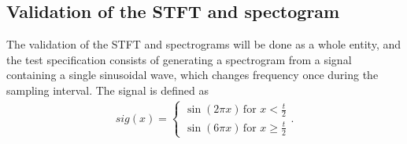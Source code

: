 \subsection{Validation of the STFT and spectogram}
The validation of the STFT and spectrograms will be done as a whole entity, and the test specification consists of generating a spectrogram from a signal containing a single sinusoidal wave, which changes frequency once during the sampling interval. The signal is defined as
\begin{align}\label{eq:SPECTROsignal}
sig(x)=\begin{cases}\sin(2\pi x)\,\text{for }x<\frac{t}{2}\\
\sin(6\pi x)\,\text{for }x\geq\frac{t}{2}
\end{cases}.
\end{align}

